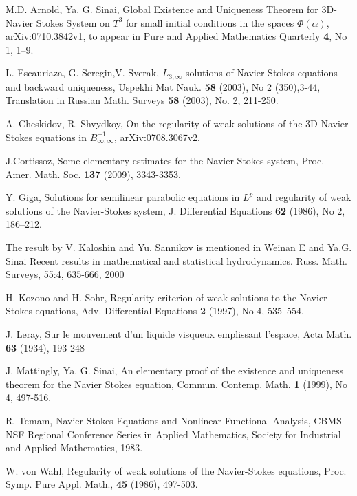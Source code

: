 \documentclass{amsart}
\begin{document}
\begin{thebibliography}{}


 
 

 M.D. Arnold, Ya. G. Sinai, Global Existence and Uniqueness Theorem
for 3D-Navier Stokes System on $T^3$ for small initial conditions in the spaces
$\Phi\left(\alpha\right)$, arXiv:0710.3842v1, to appear in Pure and Applied Mathematics 
Quarterly {\bf 4}, No 1, 1--9.

 L. Escauriaza, G. Seregin,V. Sverak, $L_{3,\infty}$-solutions of
Navier-Stokes equations and backward uniqueness, Uspekhi Mat Nauk. {\bf 58} (2003), No 2 (350),3-44,
Translation in Russian Math. Surveys {\bf 58} (2003), No. 2, 211-250.

 A. Cheskidov, R. Shvydkoy, On the regularity of weak solutions of the 3D Navier-Stokes 
equations in $B_{\infty,\infty}^{-1}$, arXiv:0708.3067v2.

 J.Cortissoz, Some elementary estimates for the 
Navier-Stokes system, Proc. Amer. Math. Soc. {\bf 137} (2009), 3343-3353.

 Y. Giga, Solutions for semilinear parabolic equations in $L^p$ and regularity 
of weak solutions of the Navier-Stokes system, J. Differential Equations {\bf 62} (1986), No 2,
186--212.

 The result by V. Kaloshin and Yu. Sannikov is mentioned in Weinan E and Ya.G. Sinai
Recent results in mathematical and statistical hydrodynamics. Russ. Math. Surveys, 55:4,
635-666, 2000

 H. Kozono and H. Sohr, Regularity criterion of weak solutions to the Navier-Stokes equations,
Adv. Differential Equations {\bf 2} (1997), No 4, 535--554.

 J. Leray, Sur le mouvement d'un liquide visqueux emplissant l'espace, Acta Math. {\bf 63} 
(1934), 193-248 

 J. Mattingly, Ya. G. Sinai, An elementary proof of the existence and uniqueness theorem
for the Navier Stokes equation, Commun. Contemp. Math. {\bf 1} (1999), No 4, 497-516.

 R. Temam, Navier-Stokes Equations and Nonlinear Functional Analysis,
CBMS-NSF Regional Conference Series in Applied Mathematics, Society for Industrial and Applied
Mathematics, 1983.

  W. von Wahl, Regularity of weak solutions of the Navier-Stokes equations, Proc. Symp. Pure
Appl. Math., {\bf 45} (1986), 497-503.
\end{thebibliography}
\end{document}
